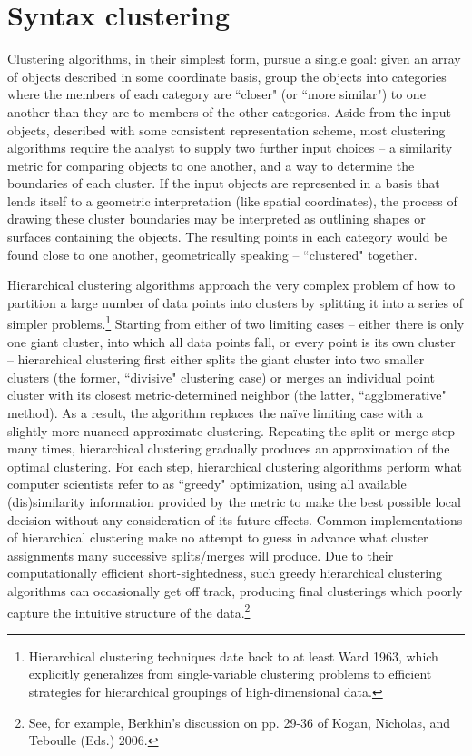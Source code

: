 \section{Syntax clustering}
Clustering algorithms, in their simplest form, pursue a single goal: given an array of objects described in some coordinate basis, group the objects into categories where the members of each category are ``closer" (or ``more similar") to one another than they are to members of the other categories.  Aside from the input objects, described with some consistent representation scheme, most clustering algorithms require the analyst to supply two further input choices -- a similarity metric for comparing objects to one another, and a way to determine the boundaries of each cluster.  If the input objects are represented in a basis that lends itself to a geometric interpretation (like spatial coordinates), the process of drawing these cluster boundaries may be interpreted as outlining shapes or surfaces containing the objects.  The resulting points in each category would be found close to one another, geometrically speaking -- ``clustered" together.

Hierarchical clustering algorithms approach the very complex problem of how to partition a large number of data points into clusters by splitting it into a series of simpler problems.\footnote{Hierarchical clustering techniques date back to at least Ward 1963, which explicitly generalizes from single-variable clustering problems to efficient strategies for hierarchical groupings of high-dimensional data.}  Starting from either of two limiting cases -- either there is only one giant cluster, into which all data points fall, or every point is its own cluster -- hierarchical clustering first either splits the giant cluster into two smaller clusters (the former, ``divisive" clustering case) or merges an individual point cluster with its closest metric-determined neighbor (the latter, ``agglomerative"  method).  As a result, the algorithm replaces the na\"{i}ve limiting case with a slightly more nuanced approximate clustering.  Repeating the split or merge step many times, hierarchical clustering gradually produces an approximation of the optimal clustering.  For each step, hierarchical clustering algorithms perform what computer scientists refer to as ``greedy" optimization, using all available (dis)similarity information provided by the metric to make the best possible local decision without any consideration of its future effects.  Common implementations of hierarchical clustering make no attempt to guess in advance what cluster assignments many successive splits/merges will produce.  Due to their computationally efficient short-sightedness, such greedy hierarchical clustering algorithms can occasionally get off track, producing final clusterings which poorly capture the intuitive structure of the data.\footnote{See, for example, Berkhin's discussion on pp. 29-36 of Kogan, Nicholas, and Teboulle (Eds.) 2006.}

